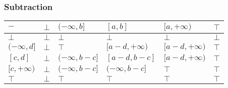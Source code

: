 \documentclass{beamer}
\begin{document}
    
        \begin{frame}
            \frametitle{Subtraction}
        \begin{table}[]
            \begin{tabular}{|l|l|l|l|l|l|}
            \hline
            $-$            & $\bot$ & $(-\infty, b]$     & $[a, b]$           & $[a, +\infty)$     & $\top$ \\ \hline
            $\bot$         & $\bot$ & $\bot$             & $\bot$             & $\bot$             & $\bot$ \\ \hline
            $(-\infty, d]$ & $\bot$ & $\top$             & $[a - d, +\infty)$ & $[a - d, +\infty)$ & $\top$ \\ \hline
            $[c, d]$       & $\bot$ & $(-\infty, b - c]$ & $[a - d, b - c]$   & $[a - d, +\infty)$ & $\top$ \\ \hline
            $[c, +\infty)$ & $\bot$ & $(-\infty, b - c]$ & $(-\infty, b - c]$ & $\top$             & $\top$ \\ \hline
            $\top$         & $\bot$ & $\top$             & $\top$             & $\top$             & $\top$ \\ \hline
            \end{tabular}
            \end{table}
        \end{frame}
    
    
    
\end{document}
